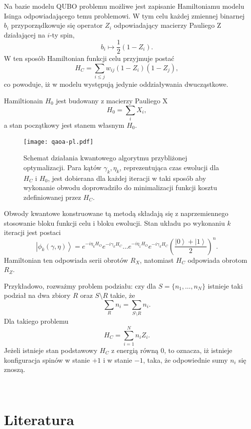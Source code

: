 \documentclass[a4paper,11pt]{article}
\newcommand{\ket}[1]{\left|{#1}\right\rangle}
\begin{document}
Na bazie modelu QUBO problemu możliwe jest zapisanie Hamiltoniamu modelu Isinga odpowiadającego temu problemowi. W tym celu każdej zmiennej binarnej $b_i$ przyporządkowuje się operator $Z_i$ odpowiadający macierzy Pauliego Z działającej na $i$-ty spin,
\[
b_i \mapsto \frac{1}{2}(1-Z_i).
\]
W ten sposób Hamiltonian funkcji celu przyjmuje postać
\[
H_C = \sum_{i\leq j} w_{ij} (1-Z_i)(1- Z_j),
\]
co powoduje, iż w modelu występują jedynie oddziaływania dwucząstkowe. 

Hamiltionain $H_0$ jest budowany z macierzy Pauliego X
\[
H_0 = \sum_i X_i,
\]
a stan początkowy jest stanem własnym $H_0$. 

\begin{figure}
	\begin{center}
		\texttt{[image: qaoa-pl.pdf]}
		\caption{Schemat działania kwantowego algorytmu przybliżonej optymalizacji. Para kątów $\gamma_k,\eta_k$, reprezentująca czas ewolucji dla $H_C$ i $H_0$, jest dobierana dla każdej iteracji w taki sposób aby wykonanie obwodu doprowadziło do minimalizacji funkcji kosztu zdefiniowanej przez $H_C$.}
	\end{center}
\end{figure}

Obwody kwantowe konstruowane tą metodą składają się z naprzemiennego stosowanie bloku funkcji celu i bloku ewolucji. Stan układu po wykonaniu $k$ iteracji jest postaci
\[
\ket{\phi_k(\gamma,\eta)} = e^{-i\eta_k H_O} e^{-i\gamma_k H_C}\dots e^{-i\eta_1 H_O}e^{-i\gamma_k H_C}\left(\frac{\ket{0}+\ket{1}}{2}\right)^n.
\]
Hamiltonian ten odpowiada serii obrotów $R_X$, natomiast $H_C$ odpowiada obrotom $R_Z$. 


Przykładowo, rozważmy problem podziału: czy dla $S=\{n_1,\dots,n_N\}$ istnieje taki podział na dwa zbiory $R$ oraz $S \setminus R$ takie, że
\[
\sum_{R}n_i = \sum_{S\setminus R} n_i.
\]
Dla takiego problemu
\[
H_C = \sum_{i=1}^N n_i Z_i.
\]
Jeżeli istnieje stan podstawowy $H_C$ z energią równą 0, to oznacza, iż istnieje konfiguracja spinów w stanie $+1$ i w stanie $-1$, taka, że odpowiednie sumy $n_i$ się znoszą.

\newpage
\ 
\newpage

\hypertarget{literatura}{%
\section*{Literatura}\label{literatura}}
\end{document}
